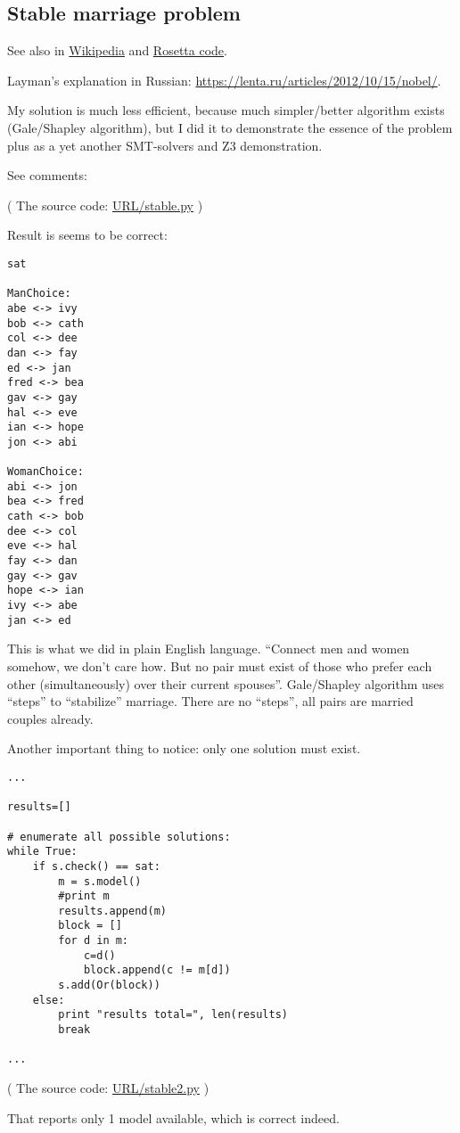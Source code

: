 \subsection{Stable marriage problem}

See also in
\href{https://en.wikipedia.org/wiki/Stable_marriage_problem}{Wikipedia} and 
\href{https://rosettacode.org/wiki/Stable_marriage_problem}{Rosetta code}.

Layman's explanation in Russian: \url{https://lenta.ru/articles/2012/10/15/nobel/}.

My solution is much less efficient, because much simpler/better algorithm exists (Gale/Shapley algorithm),
but I did it to demonstrate the essence of the problem plus as a yet another SMT-solvers and Z3 demonstration.

See comments:



( The source code: \url{URL/stable.py} )

Result is seems to be correct:

\begin{lstlisting}
sat

ManChoice:
abe <-> ivy
bob <-> cath
col <-> dee
dan <-> fay
ed <-> jan
fred <-> bea
gav <-> gay
hal <-> eve
ian <-> hope
jon <-> abi

WomanChoice:
abi <-> jon
bea <-> fred
cath <-> bob
dee <-> col
eve <-> hal
fay <-> dan
gay <-> gav
hope <-> ian
ivy <-> abe
jan <-> ed
\end{lstlisting}

This is what we did in plain English language.
``Connect men and women somehow, we don't care how.
But no pair must exist of those who prefer each other (simultaneously) over their current spouses''.
Gale/Shapley algorithm uses ``steps'' to ``stabilize'' marriage.
There are no ``steps'', all pairs are married couples already.

Another important thing to notice: only one solution must exist.

\begin{lstlisting}
...

results=[]

# enumerate all possible solutions:
while True:
    if s.check() == sat:
        m = s.model()
        #print m
        results.append(m)
        block = []
        for d in m:
            c=d()
            block.append(c != m[d])
        s.add(Or(block))
    else:
        print "results total=", len(results)
        break

...
\end{lstlisting}

( The source code: \url{URL/stable2.py} )

That reports only 1 model available, which is correct indeed.

